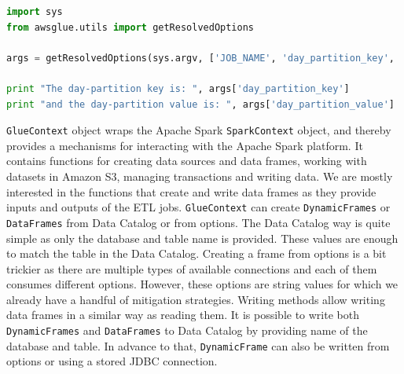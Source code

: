 \begin{lstlisting}[language=Python,caption=Usage of \texttt{getResolvedOptions} function,label=fig:resolvedOptions]
import sys
from awsglue.utils import getResolvedOptions

args = getResolvedOptions(sys.argv, ['JOB_NAME', 'day_partition_key', 'hour_partition_key', 'day_partition_value', 'hour_partition_value'])

print "The day-partition key is: ", args['day_partition_key']
print "and the day-partition value is: ", args['day_partition_value']
\end{lstlisting}
\par
\texttt{GlueContext} object wraps the Apache Spark \texttt{SparkContext} object, and thereby provides a mechanisms for interacting with the Apache Spark platform. It contains functions for creating data sources and data frames, working with datasets in Amazon S3, managing transactions and writing data. We are mostly interested in the functions that create and write data frames as they provide inputs and outputs of the ETL jobs. \texttt{GlueContext} can create \texttt{DynamicFrames} or \texttt{DataFrames} from Data Catalog or from options. The Data Catalog way is quite simple as only the database and table name is provided. These values are enough to match the table in the Data Catalog. Creating a frame from options is a bit trickier as there are multiple types of available connections and each of them consumes different options. However, these options are string values for which we already have a handful of mitigation strategies. Writing methods allow writing data frames in a similar way as reading them. It is possible to write both \texttt{DynamicFrames} and \texttt{DataFrames} to Data Catalog by providing name of the database and table. In advance to that, \texttt{DynamicFrame} can also be written from options or using a stored JDBC connection.
\par
